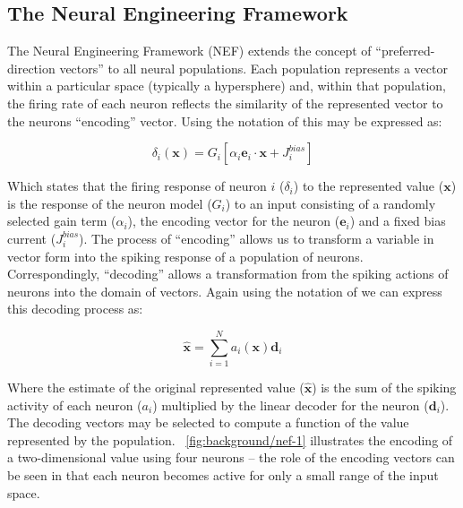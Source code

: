\documentclass[conference]{IEEEtran}
\renewcommand{\vec}{\mathbf}  %
\begin{document}
  \subsection{The Neural Engineering Framework}
  \label{sef:background/nef}

The Neural Engineering Framework (NEF) extends the concept of ``preferred-direction vectors'' \parencite{Georgopoulos1986} to all neural populations.
Each population represents a vector within a particular space (typically a hypersphere) and, within that population, the firing rate of each neuron reflects the similarity of the represented vector to the neurons ``encoding'' vector.
Using the notation of \textcite{Stewart2014} this may be expressed as:

\begin{equation}
  \delta_{i}\left(\vec{x}\right) = G_{i}\left[ \alpha_i \vec{e}_i \cdot \vec{x} + J^{bias}_i \right]
  \label{eq:encoding}
\end{equation}

Which states that the firing response of neuron $i$ ($\delta_i$) to the represented value ($\vec{x}$) is the response of the neuron model ($G_{i}$) to an input consisting of a randomly selected gain term ($\alpha_i$), the encoding vector for the neuron ($\vec{e}_i$) and a fixed bias current ($J^{bias}_i$).
The process of ``encoding'' allows us to transform a variable in vector form into the spiking response of a population of neurons.
Correspondingly, ``decoding'' allows a transformation from the spiking actions of neurons into the domain of vectors.
Again using the notation of \textcite{Stewart2014} we can express this decoding process as:

\begin{equation}
  \vec{\hat{x}} = \sum\limits_{i=1}^{N} a_i(\vec{x})\vec{d}_i  \label{eq:decoding}
\end{equation}

Where the estimate of the original represented value ($\vec{\hat{x}}$) is the sum of the spiking activity of each neuron ($a_i$) multiplied by the linear decoder for the neuron ($\vec{d}_i$).
The decoding vectors may be selected to compute a function of the value represented by the population.
\figurename~\ref{fig:background/nef-1} illustrates the encoding of a two-dimensional value using four neurons -- the role of the encoding vectors can be seen in that each neuron becomes active for only a small range of the input space.
\end{document}
